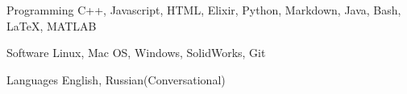 

\begin{cvskills}

  \cvskill
    {Programming} %
    {C++, Javascript, HTML, Elixir, Python, Markdown, Java, Bash, LaTeX, MATLAB} %

  \cvskill
    {Software} %
    {Linux, Mac OS, Windows, SolidWorks, Git} %

  \cvskill
    {Languages} %
    {English, Russian(Conversational)} %

\end{cvskills}
